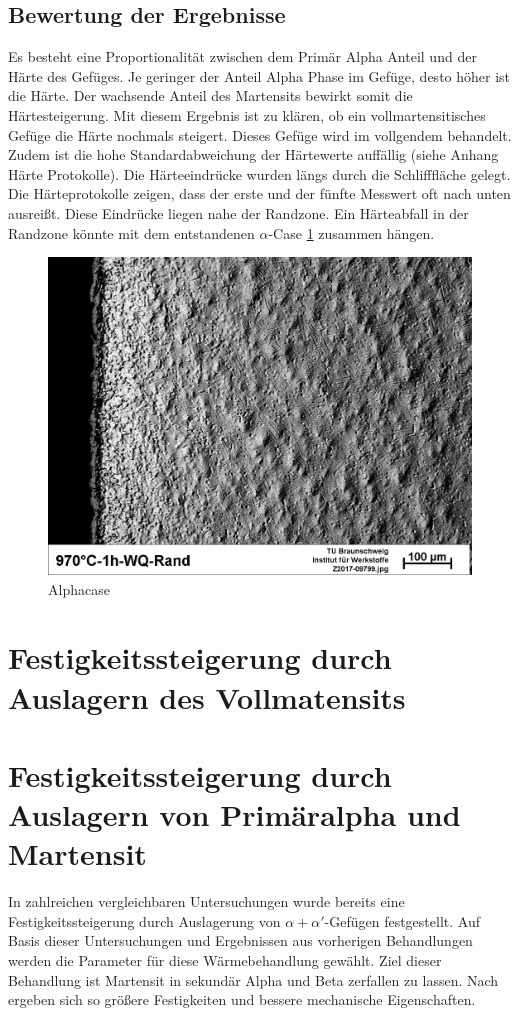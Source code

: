 \documentclass[a4paper, 11pt]{tubsreprt}
\begin{document}
\subsection{Bewertung der Ergebnisse}
Es besteht eine Proportionalität zwischen dem Primär Alpha Anteil und der Härte des Gefüges. Je geringer der Anteil Alpha Phase im Gefüge, desto höher ist die Härte. Der wachsende Anteil des Martensits bewirkt somit die Härtesteigerung. Mit diesem Ergebnis ist zu klären, ob ein vollmartensitisches Gefüge die Härte nochmals steigert. Dieses Gefüge wird im vollgendem behandelt.
Zudem ist die hohe Standardabweichung der Härtewerte auffällig (siehe Anhang Härte Protokolle). Die Härteeindrücke wurden längs durch die Schlifffläche gelegt. Die Härteprotokolle zeigen, dass der erste und der fünfte Messwert oft nach unten ausreißt. Diese Eindrücke liegen nahe der Randzone. Ein Härteabfall in der Randzone könnte mit dem entstandenen $\alpha$-Case \ref{alphacase} zusammen hängen.   

\begin{figure}
\centering
\includegraphics[width=\textwidth]{Bilder/alphacase.jpg}
\caption{Alphacase}
\label{alphacase}
\end{figure}  




\section{Festigkeitssteigerung durch Auslagern des Vollmatensits}
\section{Festigkeitssteigerung durch Auslagern von Primäralpha und Martensit}
In zahlreichen vergleichbaren Untersuchungen wurde bereits eine Festigkeitssteigerung durch Auslagerung von $\alpha + \alpha'$-Gefügen festgestellt. Auf Basis dieser Untersuchungen und Ergebnissen aus vorherigen Behandlungen werden die Parameter für diese Wärmebehandlung gewählt. Ziel dieser Behandlung ist Martensit in sekundär Alpha und Beta zerfallen zu lassen. Nach \cite{Gilbert2004} ergeben sich so größere Festigkeiten und bessere mechanische Eigenschaften.
\end{document}
